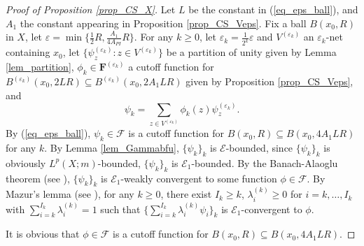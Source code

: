 \documentclass[11pt,a4paper]{article}
\numberwithin{equation}{section}
\theoremstyle{plain}
\theoremstyle{definition}
\begin{document}
\begin{proof}[Proof of Proposition \ref{prop_CS_X}]
Let $L$ be the constant in (\ref{eq_eps_ball}), and $A_1$ the constant appearing in Proposition \ref{prop_CS_Veps}. Fix a ball $B(x_0,R)$ in $X$, let $\varepsilon=\min\{\frac{1}{2}R,\frac{A_1}{4A_{PI}}R\}$. For any $k\ge0$, let $\varepsilon_k=\frac{1}{2^k}\varepsilon$ and $V^{(\varepsilon_k)}$ an $\varepsilon_k$-net containing $x_0$, let $\{\psi_z^{(\varepsilon_k)}:z\in V^{(\varepsilon_k)}\}$ be a partition of unity given by Lemma \ref{lem_partition}, $\phi_k\in\mathbf{F}^{(\varepsilon_k)}$ a cutoff function for $B^{(\varepsilon_k)}(x_0,2LR)\subseteq B^{(\varepsilon_k)}(x_0,2A_1LR)$ given by Proposition \ref{prop_CS_Veps}, and
$$\psi_k=\sum_{z\in V^{(\varepsilon_k)}}\phi_k(z)\psi_z^{(\varepsilon_k)}.$$
By (\ref{eq_eps_ball}), $\psi_k\in\mathcal{F}$ is a cutoff function for $B(x_0,R)\subseteq B(x_0,4A_1LR)$ for any $k$. By Lemma \ref{lem_Gammabfu}, $\{\psi_k\}_k$ is $\mathcal{E}$-bounded, since $\{\psi_k\}_k$ is obviously $L^p(X;m)$-bounded, $\{\psi_k\}_k$ is $\mathcal{E}_1$-bounded. By the Banach-Alaoglu theorem (see \cite[Theorem 3 in Chapter12]{Lax02}), $\{\psi_k\}_k$ is $\mathcal{E}_1$-weakly convergent to some function $\phi\in\mathcal{F}$. By Mazur's lemma (see \cite[Theorem 2 in Section V.1]{Yos95}), for any $k\ge0$, there exist $I_k\ge k$, $\lambda^{(k)}_i\ge0$ for $i=k,\ldots,I_k$ with $\sum_{i=k}^{I_k}\lambda^{(k)}_i=1$ such that $\{\sum_{i=k}^{I_k}\lambda^{(k)}_i\psi_i\}_k$ is $\mathcal{E}_1$-convergent to $\phi$.

It is obvious that $\phi\in\mathcal{F}$ is a cutoff function for $B(x_0,R)\subseteq B(x_0,4A_1LR)$.


\end{proof}
\end{document}
